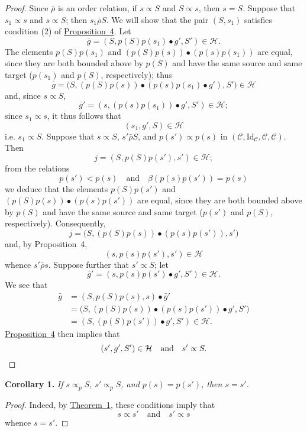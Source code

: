 \documentclass[a4paper,oneside,nobib,nofonts,notitlepage,notoc,nols,fleqn,justified]{tufte-book}
\newenvironment{itenv}[1]
  {\phantomsection\par\medskip\noindent\textbf{#1.}\itshape}
  {\par\medskip}
\newcommand{\oldpage}[1]{{\reversemarginpar\marginnote{\raggedleft\footnotesize\textit{p.~#1}}}}
\newcommand{\CC}{\mathcal{C}}
\newcommand{\HH}{\mathcal{H}}
\newcommand{\relrhobar}{\mathrel{\bar{\rho}}}
\newcommand{\subs}{\mathrel{\propto}}
\newcommand{\Id}{\mathrm{Id}}
\begin{document}
\begin{proof}
  Since $\relrhobar$ is an order relation, if $s\subs S$ and $S\subs s$, then $s=S$.
  Suppose that $s_1\subs s$ and $s\subs S$;
  then $s_1\relrhobar S$.
  We will show that the pair $(S,s_1)$ satisfies condition (2\textquotesingle) of \hyperref[proposition:i-4]{Proposition~4}.
  Let
  \[
    \bar{g}
    = (S,p(S)p(s_1)\bullet g',S')
    \in\HH.
  \]
  The elements $p(S)p(s_1)$ and $(p(S)p(s))\bullet(p(s)p(s_1))$ are equal, since they are both bounded above by $p(S)$ and have the same source and same target ($p(s_1)$ and $p(S)$, respectively);
  thus
  \[
    \bar{g}
    = \big(S,(p(S)p(s))\bullet(p(s)p(s_1)\bullet g'),S'\big)
    \in\HH
  \]
  and, since $s\subs S$,
  \[
    \bar{g}'
    = (s,(p(s)p(s_1))\bullet g', S')
    \in\HH;
  \]
  since $s_1\subs s$, it thus follows that
  \[
    (s_1,g',S)
    \in\HH
  \]
  i.e. $s_1\subs S$.
  Suppose that $s\subs S$, $s'\relrhobar S$, and $p(s')\subs p(s)$ in $(\CC,\Id_\CC,\CC,\CC)$.
  Then
  \[
    j
    = (S,p(S)p(s'),s')
    \in\HH;
  \]
  from the relations
  \[
    p(s') < p(s)
    \quad\text{and}\quad
    \beta(p(s)p(s')) = p(s)
  \]
  we deduce that the elements $p(S)p(s')$ and $(p(S)p(s))\bullet(p(s)p(s'))$ are equal, since they are both bounded above by $p(S)$ and have the same source and same target ($p(s')$ and $p(S)$, respectively).
  Consequently,
  \[
    j
    = \big(S,(p(S)p(s))\bullet(p(s)p(s')),s'\big)
  \]
  and, by Proposition~4,
  \[
    (s,p(s)p(s'),s')
    \in\HH
  \]
  whence $s'\relrhobar s$.
  Suppose further that $s'\subs S$;
  let
  \[
    \bar{g}'
    = (s,p(s)p(s')\bullet g',S')
    \in\HH.
  \]
  We see that
  \[
    \begin{aligned}
      \bar{g}
      &= (S,p(S)p(s),s)\bullet\bar{g}'
    \\&= \big(S,(p(S)p(s))\bullet(p(s)p(s'))\bullet g',S'\big)
    \\&= (S,(p(S)p(s'))\bullet g',S')
    \in\HH.
    \end{aligned}
  \]
  \oldpage{363}
  \hyperref[proposition:i-4]{Proposition~4} then implies that
  \[
    (s',g',S')\in\HH
    \quad\text{and}\quad
    s'\subs S.
    \qedhere
  \]
\end{proof}

\begin{itenv}{Corollary 1}
  If $s\subs_p S$, $s'\subs_p S$, and $p(s)=p(s')$, then $s=s'$.
\end{itenv}

\begin{proof}
  Indeed, by \hyperref[theorem:1]{Theorem~1}, these conditions imply that
  \[
    s\subs s'
    \quad\text{and}\quad
    s'\subs s
  \]
  whence $s=s'$.
\end{proof}
\end{document}
